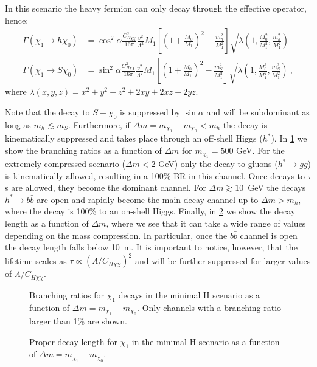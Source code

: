 \documentclass[a4paper,11pt]{article}
\begin{document}
In this scenario the heavy fermion can only decay through the effective operator, hence:
\begin{align}
	\Gamma (\chi_1 \to h \chi_0) & = \cos^2\alpha \frac{C_{H\chi\chi}^2}{16 \pi} \frac{v^2}{\Lambda^2} M_1 \left[\left(1 + \frac{M_0}{M_1}\right)^2 - \frac{m_h^2}{M_1^2} \right]  \sqrt{\lambda\left(1,\frac{M_0^2}{M_1^2},\frac{m_h^2}{M_1^2}\right)}\\
	\Gamma (\chi_1 \to S \chi_0) & = \sin^2\alpha \frac{C_{H\chi\chi}^2}{16 \pi} \frac{v^2}{\Lambda^2} M_1 \left[\left(1 + \frac{M_0}{M_1}\right)^2 - \frac{m_S^2}{M_1^2} \right]  \sqrt{\lambda\left(1,\frac{M_0^2}{M_1^2},\frac{m_S^2}{M_1^2}\right)}\, ,
\end{align} 
where $\lambda(x,y,z) = x^2 + y^2 + z^2 + 2 x y + 2 x z + 2 y z$.


Note that the decay to $S + \chi_0$ is suppressed by $\sin\alpha$ and will be subdominant as long as $m_h \lesssim m_S$.
Furthermore, if $\Delta m = m_{\chi_1} - m_{\chi_0}  < m_h$ the decay is kinematically suppressed and takes place through an off-shell Higgs ($h^*$). In \cref{fig:chi1_decayH} we show the branching ratios as a function of $\Delta m$ for $m_{\chi_1} = 500$ GeV.
For the extremely compressed scenario ($\Delta m < 2$ GeV) only the decay to gluons ($h^* \to g g$) is kinematically allowed, resulting in a 100\% BR in this channel. Once decays to $\tau$s are allowed, they become the dominant channel. For $\Delta m \gtrsim 10$~GeV the decays $h^* \to b \bar{b}$ are open and rapidly become the main decay channel up to $\Delta m > m_h$, where the decay is 100\% to an on-shell Higgs.
Finally, in \cref{fig:chi1_lifetimeH} we show the decay length as a function of $\Delta m$, where we see that it can take a wide range of values depending on the mass compression. In particular, once the $b \bar{b}$ channel is open the decay length falls below 10~m. It is important to notice, however, that the lifetime scales as  $\tau \propto \left(\Lambda/C_{H\chi\chi}\right)^2$ and will be further suppressed for larger values of $\Lambda/C_{H\chi\chi}$.

\begin{figure}
	\centering
	\caption{Branching ratios for $\chi_1$ decays in the minimal H scenario as a function of $\Delta m = m_{\chi_1} - m_{\chi_0}$. Only channels with a branching ratio larger than 1\% are shown.} \label{fig:chi1_decayH}
\end{figure}

\begin{figure}
	\centering
	\caption{Proper decay length for $\chi_1$ in the minimal H scenario as a function of $\Delta m = m_{\chi_1} - m_{\chi_0}$.} \label{fig:chi1_lifetimeH}
\end{figure}
\end{document}
